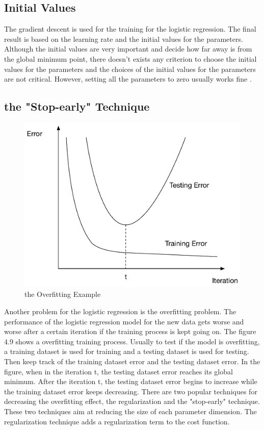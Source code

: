 \subsection{Initial Values}
The gradient descent is used for the training for the logistic regression. The final result is based on the learning rate and the initial values for the parameters. Although the initial values are very important and decide how far away is from the global minimum point, there doesn't exists any criterion to choose the initial values for the parameters and the choices of the initial values for the parameters are not critical. However, setting all the parameters to zero usually works fine \cite{allison2008convergence}. 

\subsection{the "Stop-early" Technique}
\begin{figure}
\centering
\includegraphics[scale=0.6]{overfittingExample.pdf}
\caption{the Overfitting Example}
\end{figure} 
Another problem for the logistic regression is the overfitting problem. The performance of the logistic regression model for the new data gets worse and worse after a certain iteration if the training process is kept going on. The figure 4.9 shows a overfitting training process. Usually to test if the model is overfitting, a training dataset is used for training and a testing dataset is used for testing. Then keep track of the training dataset error and the testing dataset error. In the figure, when in the iteration t, the testing dataset error reaches its global minimum. After the iteration t, the testing dataset error begins to increase while the training dataset error keeps decreasing. There are two popular techniques for decreasing the overfitting effect, the regularization and the "stop-early" technique. These two techniques aim at reducing the size of each parameter dimension. The regularization technique adds a regularization term to the cost function.
